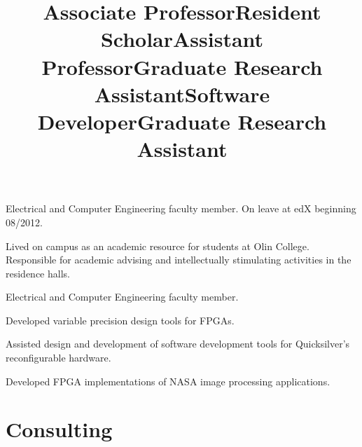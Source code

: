 \documentclass[line]{res}
\begin{document}
\begin{resume}
	\title{Associate Professor} 
	  
	\begin{position}
		Electrical and Computer Engineering faculty member. On leave at edX beginning 08/2012.
	\end{position}
	
	\title{Resident Scholar} 
	  
	\begin{position}
		Lived on campus as an academic resource for students at Olin College.
		Responsible for academic advising and intellectually stimulating activities
		in the residence halls.
	\end{position}
	
	\title{Assistant Professor} 
	  
	\begin{position}
		Electrical and Computer Engineering faculty member. 
	\end{position}
	
	\title{Graduate Research Assistant} 
	  
	\begin{position}
		Developed variable precision design tools for FPGAs. 
	\end{position}
	
	\title{Software Developer} 
	  
	\begin{position}
		Assisted design and development of software development tools for Quicksilver's reconfigurable hardware. 
	\end{position}
	
	\title{Graduate Research Assistant} 
	  
	\begin{position}
		Developed FPGA implementations of NASA image processing applications. 
	\end{position}

	\section{\sc Consulting}
	\begin{format}
		\\
		\body\\
	\end{format}


\end{resume}
\end{document}
